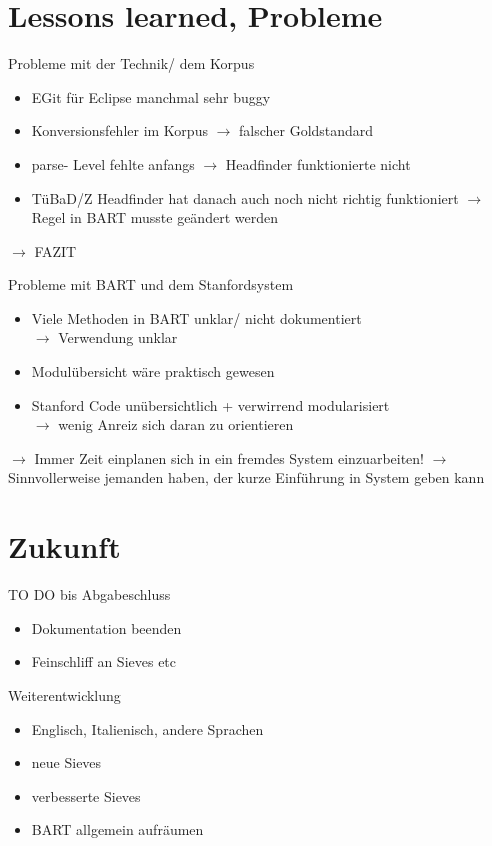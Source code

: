 \documentclass[11pt,a4paper]{beamer}
\begin{document}
\section{Lessons learned, Probleme}
\begin{frame}{Probleme mit der Technik/ dem Korpus}
\begin{itemize}
\item EGit für Eclipse manchmal sehr buggy
\item Konversionsfehler im Korpus $\rightarrow$ falscher Goldstandard
\item parse- Level fehlte anfangs $\rightarrow$ Headfinder funktionierte nicht
\item TüBaD/Z Headfinder hat danach auch noch nicht richtig funktioniert $\rightarrow$ Regel in BART musste geändert werden
\end{itemize}
$\rightarrow$  FAZIT

\end{frame}


\begin{frame}{Probleme mit BART und dem Stanfordsystem}
\begin{itemize}
\item Viele Methoden in BART unklar/ nicht dokumentiert \\$\rightarrow$  Verwendung unklar
\item Modulübersicht wäre praktisch gewesen
\item Stanford Code unübersichtlich + verwirrend modularisiert\\$\rightarrow$ wenig Anreiz sich daran zu orientieren
\end{itemize}
$\rightarrow$ Immer Zeit einplanen sich in ein fremdes System einzuarbeiten!
$\rightarrow$ Sinnvollerweise jemanden haben, der kurze Einführung in System geben kann
\end{frame}



\section{Zukunft}
\begin{frame}{TO DO bis Abgabeschluss}
\begin{itemize}
\item Dokumentation beenden
\item Feinschliff an Sieves etc
\end{itemize}
\end{frame}

\begin{frame}{Weiterentwicklung}
\begin{itemize}
\item Englisch, Italienisch, andere Sprachen
\item neue Sieves 
\item verbesserte Sieves
\item BART allgemein aufräumen
\end{itemize}
\end{frame}


%
%
\end{document}
